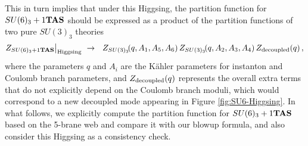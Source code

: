 This in turn implies that under this Higgsing, the partition function for $SU(6)_{3}+1{\bf TAS}$ should be expressed as a product of the partition functions of two pure $SU(3)_3$ theories  
\begin{align}
Z_{SU(6)_{3}+1{\bf TAS}}\big|_{\rm Higgsing}~\rightarrow ~~ Z_{SU(3)_{3}}\!(q,A_1, A_5,A_6)\,Z_{SU(3)_{3}}\!(q,A_2, A_3,A_4)\,Z_{\rm decoupled}(q)\,,	
\end{align}
where the parameters $q$ and $A_i$ are the K\"ahler parameters for instanton and Coulomb branch parameters, and  $Z_{\rm decoupled}(q)$ represents the overall extra terms that do not explicitly depend on the Coulomb branch moduli, which would correspond to a new decoupled mode appearing in Figure \ref{fig:SU6-Higgsing}.  In what follows, we explicitly compute the partition function for $SU(6)_3+1{\bf TAS}$ based on the 5-brane web and compare it with our blowup formula, and also consider this Higgsing as a consistency check.

